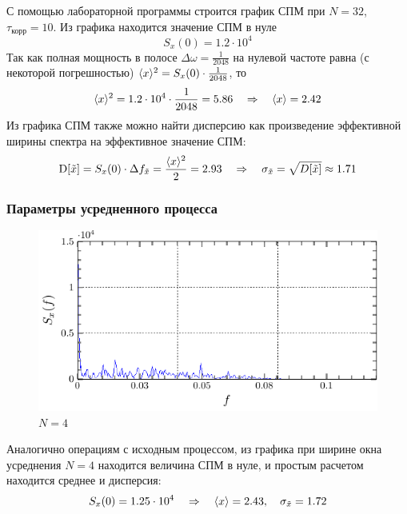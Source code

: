 \documentclass[a4paper,14pt]{extarticle}
\begin{document}
С помощью лабораторной программы строится график СПМ при $N=32$, $\tau_\text{корр}=10$. Из графика находится значение СПМ в нуле
\begin{equation}
    S_x(0) = 1.2\cdot 10^4
\end{equation}
Так как полная мощность в полосе $\Delta\omega = \frac{1}{2048}$ на нулевой частоте равна (с некоторой погрешностью) $\langle x\rangle^2 = S_x(0)\cdot \frac{1}{2048}$, то
\begin{equation}
    \langle x\rangle^2 = 1.2\cdot 10^4\cdot \frac{1}{2048} = 5.86
    \quad \Rightarrow \quad \langle x\rangle=2.42
\end{equation}
Из графика СПМ также можно найти дисперсию как произведение эффективной ширины спектра на эффективное значение СПМ:
\begin{equation}
    \mathrm{D}[\tilde{x}] = S_x(0)\cdot \Delta f_{\tilde{x}} =\frac{\langle x\rangle^2}{2} = 2.93 
    \quad \Rightarrow \quad
    \sigma_{\tilde{x}} = \sqrt{D[\tilde{x}]}\approx 1.71
\end{equation}


\subsubsection{Параметры усредненного процесса}

\begin{figure}[H]
    \centering
    \includegraphics[width=0.7\linewidth]{fig/S_from_f_100_ex52_n4}
    \vspace{-0.7em}
    \caption{$N=4$}
    \label{fig:sko_ex52_n4}
\end{figure}

Аналогично операциям с исходным процессом, из графика при ширине окна усреднения $N=4$ находится величина СПМ в нуле, и простым расчетом находится среднее и дисперсия:
\begin{equation}
    S_x(0) = 1.25 \cdot 10^4
    \quad \Rightarrow \quad
    \langle x\rangle=2.43, \quad
    \sigma_{\tilde{x}} =  1.72
\end{equation}
\end{document}
